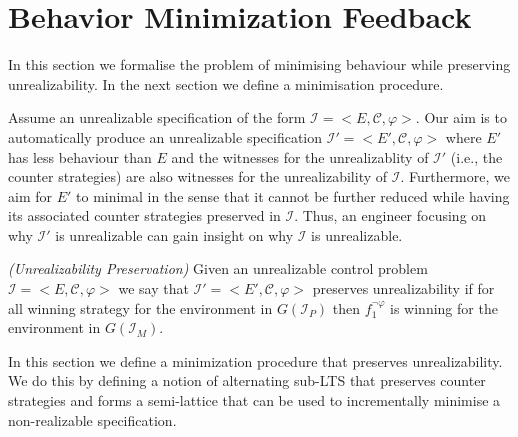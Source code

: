 \section{Behavior Minimization Feedback}

In this section we formalise the problem of minimising behaviour while preserving unrealizability. In the next section we define a minimisation procedure.

Assume an unrealizable specification of the form $\mathcal{I} = <E, \mathcal{C}, \varphi>$. Our aim is to automatically produce an unrealizable specification $\mathcal{I'} = <E', \mathcal{C}, \varphi>$ where $E'$ has less behaviour than $E$ and the witnesses for the unrealizablity of $\mathcal{I'}$ (i.e., the counter strategies) are also witnesses for the unrealizability of $\mathcal{I}$.  Furthermore, we aim for $E'$ to minimal in the sense that it cannot be further reduced while having its associated counter strategies preserved in  $\mathcal{I}$.
Thus, an engineer focusing on why  $\mathcal{I'}$ is unrealizable can gain insight on why $\mathcal{I}$ is unrealizable. 


\begin{definition}\label{}\emph{(Unrealizability Preservation)}
Given an unrealizable control problem $\mathcal{I} = <E, \mathcal{C}, \varphi>$ we say
that $\mathcal{I'} = <E', \mathcal{C}, \varphi>$ preserves unrealizability
 if for all  winning strategy \counterS for
the environment in $G(\mathcal{I}_P)$ 
then $f_1^{\neg \varphi}$ is winning for the environment in
$G(\mathcal{I}_M)$.
\end{definition}


In this section we define a minimization procedure that preserves unrealizability. We do this by defining a notion of alternating sub-LTS that preserves counter strategies and forms a semi-lattice that can be used to incrementally minimise a non-realizable specification. 

%

